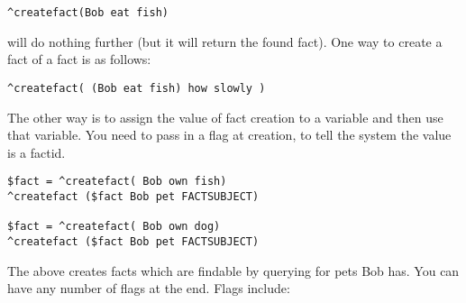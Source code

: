 \documentclass[]{article}
\begin{document}
\begin{verbatim}
^createfact(Bob eat fish)
\end{verbatim}

will do nothing further (but it will return the found fact). One way to
create a fact of a fact is as follows:

\begin{verbatim}
^createfact( (Bob eat fish) how slowly )
\end{verbatim}

The other way is to assign the value of fact creation to a variable and
then use that variable. You need to pass in a flag at creation, to tell
the system the value is a factid.

\begin{verbatim}
$fact = ^createfact( Bob own fish)
^createfact ($fact Bob pet FACTSUBJECT)

$fact = ^createfact( Bob own dog)
^createfact ($fact Bob pet FACTSUBJECT)
\end{verbatim}

The above creates facts which are findable by querying for pets Bob has.
You can have any number of flags at the end. Flags include:
\end{document}
